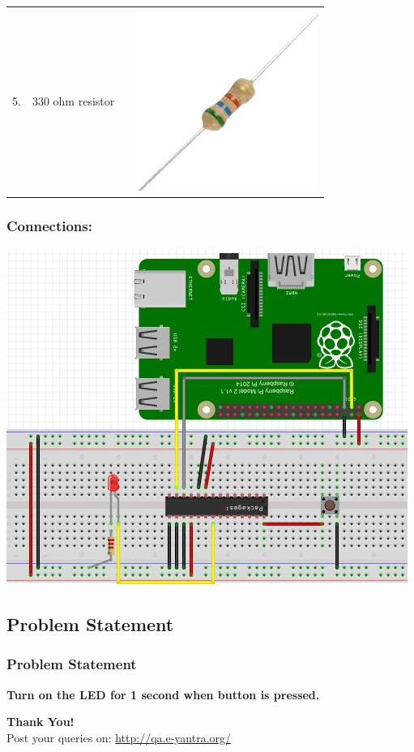 \documentclass[10pt,red]{beamer}
\begin{document}
\begin{frame}
\begin{tabular}{c c c c }
			 5.  & 330 ohm resistor & &\includegraphics[scale = 0.1]{resistor}  \\
		\end{tabular}
\end{frame}
	\begin{frame}
		\frametitle{Connections:} \pause
		\centering
		\includegraphics[scale=0.6]{mcp23017_connection}
	\end{frame}
	
\subsection{Problem Statement}
\begin{frame}
	\frametitle{Problem Statement} \pause
	\textbf{Turn on the LED for 1 second when button is pressed.}
\end{frame}
\begin{frame}
	\hskip4cm
	\textbf{\LARGE Thank You!} \\[20pt]
	\hskip3cm
	\scriptsize Post your queries on: 
	\hyperref[www.e-yantra.org]{\color{blue} http://qa.e-yantra.org/ \color{black}} 
\end{frame}
\end{document}
